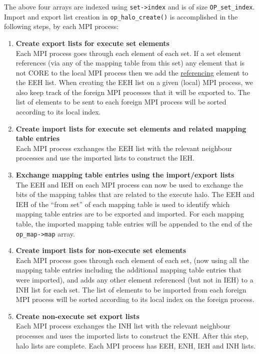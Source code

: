 \documentclass[11pt]{article}
\begin{document}
\noindent The above four arrays are indexed using \texttt{set->index} and is of size \texttt{OP\_set\_index}. Import and
export list creation in \texttt{op\_halo\_create()} is accomplished in the following steps, by each MPI process:
\begin{enumerate}
\item \textbf{Create export lists for execute set elements}\\
Each MPI process goes through each element of each set. If a set element references (via any of the mapping table from
this set) any element that is not CORE to the local MPI process then we add the \underline{referencing} element to the
EEH list. When creating the EEH list on a given (local) MPI process, we also keep track of the foreign MPI processes
that it will be exported to. The list of elements to be sent to each foreign MPI process will be sorted according to its
local index.

\item \textbf{Create import lists for execute set elements and related mapping table entries}\\
Each MPI process exchanges the EEH list with the relevant neighbour processes and use the imported lists to
construct the IEH.

\item \textbf{Exchange mapping table entries using the import/export lists}\\
The EEH and IEH on each MPI process can now be used to exchange the bits of the mapping tables that are related to the
execute halo. The EEH and IEH of the ``from set'' of each mapping table is used to identify which mapping table entries
are to be exported and imported. For each mapping table, the imported mapping table entries will be appended to the end
of the \texttt{op\_map->map} array.

\item \textbf{Create import lists for non-execute set elements }\\
Each MPI process goes through each element of each set, (now using all the mapping table entries including the
additional mapping table entries that were imported), and adds any other element referenced (but not in IEH) to a INH
list for each set. The list of elements to be imported from each foreign MPI process will be sorted according to its
local index on the foreign process.

\item \textbf{Create non-execute set export lists}\\
Each MPI process exchanges the INH list with the relevant neighbour processes and uses the imported lists to
construct the ENH. After this step, halo lists are complete. Each MPI process has EEH, ENH, IEH and INH lists.


\end{enumerate}
\end{document}
